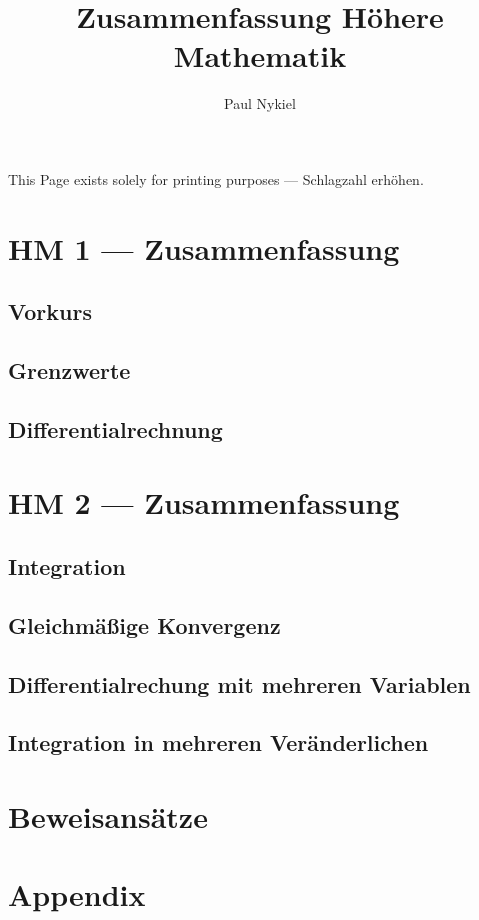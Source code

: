 \documentclass[10pt]{report}
\title{Zusammenfassung Höhere Mathematik}
\author{Paul Nykiel}
\begin{document}
    \maketitle
    \pagebreak
    This Page exists solely for printing purposes --- Schlagzahl erhöhen.
    \pagebreak
    \tableofcontents
    \pagebreak

    \part{HM 1 --- Zusammenfassung}
    \chapter{Vorkurs}
    

    \chapter{Grenzwerte}
    

    \chapter{Differentialrechnung}
    

    \part{HM 2 --- Zusammenfassung}
    \chapter{Integration}
    

    \chapter{Gleichmäßige Konvergenz}
    

    \chapter{Differentialrechung mit mehreren Variablen}
    

    \chapter{Integration in mehreren Veränderlichen}
    

    \part{Beweisansätze}
    

    \part{Appendix}
    
\end{document}
